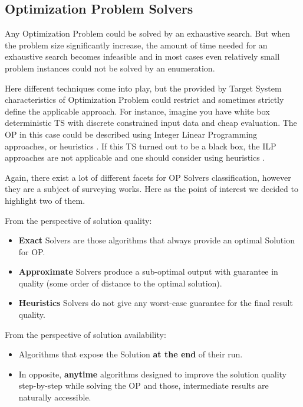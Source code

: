 \subsection{Optimization Problem Solvers}\label{BG: subsection OP Solvers}
Any Optimization Problem could be solved by an exhaustive search. 
But when the problem size significantly increase, the amount of time needed for an exhaustive search becomes infeasible and in most cases even relatively small problem instances could not be solved by an enumeration.

Here different techniques come into play, but the provided by Target System characteristics of Optimization Problem could restrict and sometimes strictly define the applicable approach.
For instance, imagine you have white box deterministic TS with discrete constrained input data and cheap evaluation. The OP in this case could be described using Integer Linear Programming  approaches, or heuristics . If this TS turned out to be a black box, the ILP approaches are not applicable and one should consider using heuristics \cite{biegler2004retrospective}.


Again, there exist a lot of different facets for OP Solvers classification, however they are a subject of surveying works. Here as the point of interest we decided to highlight two of them.

From the perspective of solution quality:
\begin{itemize}
	\item \textbf{Exact} Solvers are those algorithms that always provide an optimal Solution for OP.
	\item \textbf{Approximate} Solvers produce a sub-optimal output with guarantee in quality (some order of distance to the optimal solution).
	\item \textbf{Heuristics} Solvers do not give any worst-case guarantee for the final result quality.
\end{itemize}

From the perspective of solution availability:
\begin{itemize}
	\item Algorithms that expose the Solution \textbf{at the end} of their run.
	\item In opposite, \textbf{anytime} algorithms designed to improve the solution quality step-by-step while solving the OP and those, intermediate results are naturally accessible. 
\end{itemize}

